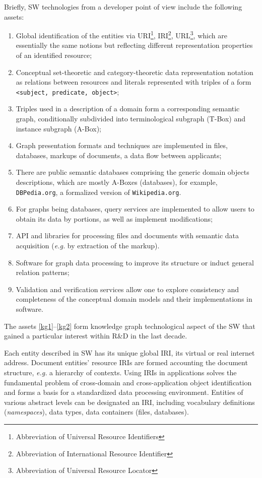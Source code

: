 \documentclass[
]{ceurart}
\begin{document}
Briefly, SW technologies from a developer point of view include the following assets:
\begin{enumerate}
\item Global identification of the entities via URI\footnote{Abbreviation of Universal Resource Identifiers}, IRI\footnote{Abbreviation of International Resource Identifier}, URL\footnote{Abbreviation of Universal Resource Locator}, which are essentially the same notions but reflecting different representation properties of an identified resource;
\item Conceptual set-theoretic and category-theoretic data representation notation as relations between resources and literals represented with triples of a form \texttt{<subject, predicate, object>};
\item Triples used in a description of a domain form a corresponding semantic graph, conditionally subdivided into terminological subgraph (T-Box) and instance subgraph (A-Box);
\item Graph presentation formats and techniques are implemented in files, databases, markups of documents, a data flow between applicants; \label{kg1}
\item There are public semantic databases comprising the generic domain objects descriptions, which are mostly A-Boxes (databases), for example, \texttt{DBPedia.org}, a formalized version of \texttt{Wikipedia.org}. %
\item For graphs being databases, query services are implemented to allow users to obtain its data by portions, as well as implement modifications;
\item API and libraries for processing files and documents with semantic data acquisition (\emph{e.g.} by extraction of the markup).
\item Software for graph data processing to improve its structure or induct general relation patterns;
\item Validation and verification services allow one to explore consistency and completeness of the conceptual domain models and their implementations in software. \label{kg2}
\end{enumerate}
The assets  \ref{kg1}--\ref{kg2} form knowledge graph technological aspect of the SW that gained a particular interest within R\&D in the last decade.

Each entity described in SW has its unique global IRI, its virtual or real internet address.  Document entities' resource IRIs are formed accounting the document structure, \emph{e.g.} a hierarchy of contexts.  Using IRIs in applications solves the fundamental problem of cross-domain and cross-application object identification and forms a basis for a standardized data processing environment.  Entities of various abstract levels can be designated an IRI, including vocabulary definitions (\emph{namespaces}), data types, data containers (files, databases).
\end{document}
